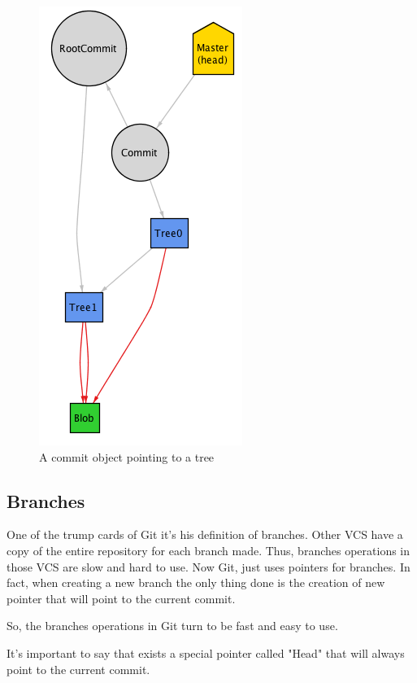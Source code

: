 \begin{figure}[h!] 
	\caption{A commit object pointing to a tree}
	\centering
	\includegraphics[scale=0.65]{images/commitobject.png}
\end{figure}

\subsection{Branches}
One of the trump cards of Git it's his definition of branches. Other VCS
have a copy of the entire repository for each branch made. Thus, branches
operations in those VCS are slow and hard to use. Now Git, just uses 
pointers for branches. In fact, when creating a new branch the only thing
done is the creation of new pointer that will point to the current commit. \par
So, the branches operations in Git turn to be fast and easy to use. \par
It's important to say that exists a special pointer called "Head" that will 
always point to the current commit. \par

